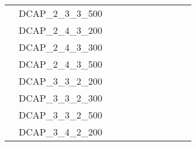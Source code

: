 \begin{table}[]
{\begin{tabular}{|c|l|lll|lll|l|l|l|}
			& DCAP\_2\_3\_3\_500            &                                   &                                 &             &                           &                         &      &                                         &                                 &                                \\
			& DCAP\_2\_4\_3\_200            &                                   &                                 &             &                           &                         &      &                                         &                                 &                                \\
			& DCAP\_2\_4\_3\_300            &                                   &                                 &             &                           &                         &      &                                         &                                 &                                \\
			& DCAP\_2\_4\_3\_500            &                                   &                                 &             &                           &                         &      &                                         &                                 &                                \\
			& DCAP\_3\_3\_2\_200            &                                   &                                 &             &                           &                         &      &                                         &                                 &                                \\
			& DCAP\_3\_3\_2\_300            &                                   &                                 &             &                           &                         &      &                                         &                                 &                                \\
			& DCAP\_3\_3\_2\_500            &                                   &                                 &             &                           &                         &      &                                         &                                 &                                \\
			& DCAP\_3\_4\_2\_200            &                                   &                                 &             &                           &                         &      &                                         &                                 &                                \\

\end{tabular}}
\end{table}
